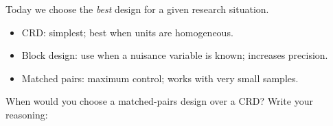 \documentclass[10pt]{article}
\begin{document}
\vspace{0.12in}

\noindent Today we choose the \emph{best} design for a given research situation.

\vspace{0.14in}

\begin{tcolorbox}[colback=greenbg, colframe=greenacc, boxrule=0.8pt, arc=2mm,
    left=4mm, right=4mm, top=3mm, bottom=3mm]
    \small
    \begin{itemize}[leftmargin=1.3em, itemsep=8pt]
  \item CRD: simplest; best when units are homogeneous.
  \item Block design: use when a nuisance variable is known; increases precision.
  \item Matched pairs: maximum control; works with very small samples.
    \end{itemize}
\end{tcolorbox}

\vspace{0.2in}

\noindent\textcolor{slate}{\small When would you choose a matched-pairs design over a
CRD? Write your reasoning:}\\[8pt]
\writeline\\[2pt]\writeline
\end{document}
